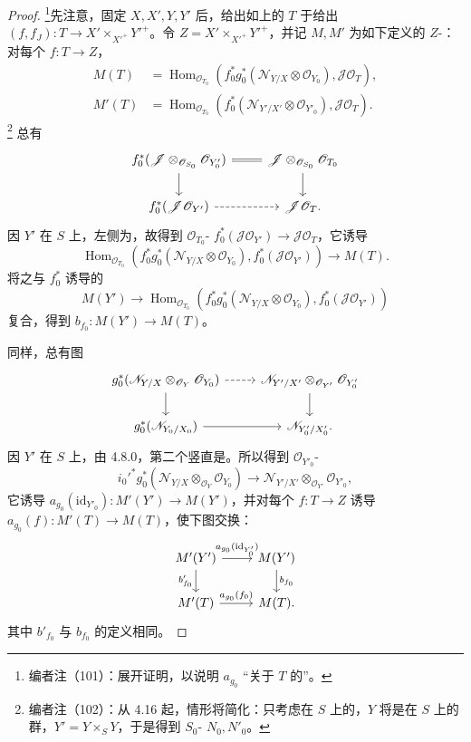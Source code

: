\begin{proof}
\footnote{编者注（101）：展开证明，以说明 $a_{g_0}$ “关于 $T$ 的”。}先注意，固定 $X,X',Y,Y'$ 后，给出如上的 $T$ 于给出 $(f,f_J):T\to X'\times_{X'^+}Y'^+$。令 $Z=X'\times_{X'^+}Y'^+$，并记 $M,M'$ 为如下定义的 $Z$-：对每个 $f:T\to Z$，
\[
\begin{aligned}
M(T)&=\operatorname{Hom}_{\mathscr O_{T_0}}(f_0^*g_0^*(\mathscr N_{Y/X}\otimes\mathscr O_{Y_0}),\mathscr J\mathscr O_T),\\
M'(T)&=\operatorname{Hom}_{\mathscr O_{T_0}}(f_0^*(\mathscr N_{Y'/X'}\otimes\mathscr O_{Y'_0}),\mathscr J\mathscr O_T).
\end{aligned}
\]
\footnote{编者注（102）：从 4.16 起，情形将简化：只考虑在 $S$ 上的，$Y$ 将是在 $S$ 上的群，$Y'=Y\times_S Y$，于是得到 $S_0$- $N_0,N'_0$。}
总有
\[
\begin{tikzcd}
f_0^*(\mathscr J\otimes_{\mathscr O_{S_0}}\mathscr O_{Y'_0})\arrow[r,equal]\arrow[d]&\mathscr J\otimes_{\mathscr O_{S_0}}\mathscr O_{T_0}\arrow[d]\\
f_0^*(\mathscr J\mathscr O_{Y'})\arrow[r,dashed]&\mathscr J\mathscr O_T.
\end{tikzcd}
\]
因 $Y'$ 在 $S$ 上，左侧为，故得到 $\mathscr O_{T_0}$- $f_0^*(\mathscr J\mathscr O_{Y'})\to\mathscr J\mathscr O_T$，它诱导
\[\operatorname{Hom}_{\mathscr O_{T_0}}(f_0^*g_0^*(\mathscr N_{Y/X}\otimes\mathscr O_{Y_0}),f_0^*(\mathscr J\mathscr O_{Y'}))\longrightarrow M(T).\]
将之与 $f_0^*$ 诱导的
\[M(Y')\longrightarrow\operatorname{Hom}_{\mathscr O_{T_0}}(f_0^*g_0^*(\mathscr N_{Y/X}\otimes\mathscr O_{Y_0}),f_0^*(\mathscr J\mathscr O_{Y'}))\]
复合，得到 $b_{f_0}:M(Y')\to M(T)$。

同样，总有图
\[
\begin{tikzcd}
g_0^*(\mathscr N_{Y/X}\otimes_{\mathscr O_Y}\mathscr O_{Y_0})\arrow[r,dashed]\arrow[d]&\mathscr N_{Y'/X'}\otimes_{\mathscr O_{Y'}}\mathscr O_{Y'_0}\arrow[d]\\
g_0^*(\mathscr N_{Y_0/X_0})\arrow[r]&\mathscr N_{Y'_0/X'_0}.
\end{tikzcd}
\]
因 $Y'$ 在 $S$ 上，由 4.8.0，第二个竖直是。所以得到 $\mathscr O_{Y'_0}$-
\[i_0'^*g_0^*(\mathscr N_{Y/X}\otimes_{\mathscr O_Y}\mathscr O_{Y_0})\longrightarrow\mathscr N_{Y'/X'}\otimes_{\mathscr O_{Y'}}\mathscr O_{Y'_0},\]
它诱导 $a_{g_0}(\mathrm{id}_{Y'_0}):M'(Y')\to M(Y')$，并对每个 $f:T\to Z$ 诱导 $a_{g_0}(f):M'(T)\to M(T)$，使下图交换：
\[
\begin{tikzcd}
M'(Y')\arrow[r,"a_{g_0}(\mathrm{id}_{Y'_0})"]\arrow[d,"b'_{f_0}"']&M(Y')\arrow[d,"b_{f_0}"]\\
M'(T)\arrow[r,"a_{g_0}(f_0)"]&M(T).
\end{tikzcd}
\]
其中 $b'_{f_0}$ 与 $b_{f_0}$ 的定义相同。
\end{proof}
